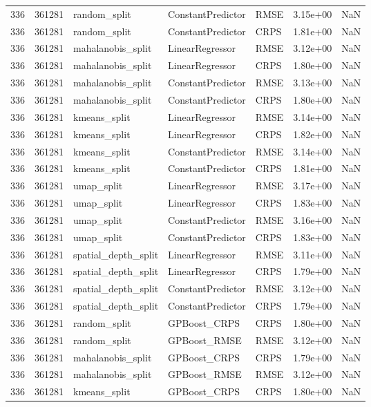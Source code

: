 \begin{tabular}{rrlllrr}
336 & 361281 & random\_split & ConstantPredictor & RMSE & 3.15e+00 & NaN \\
336 & 361281 & random\_split & ConstantPredictor & CRPS & 1.81e+00 & NaN \\
336 & 361281 & mahalanobis\_split & LinearRegressor & RMSE & 3.12e+00 & NaN \\
336 & 361281 & mahalanobis\_split & LinearRegressor & CRPS & 1.80e+00 & NaN \\
336 & 361281 & mahalanobis\_split & ConstantPredictor & RMSE & 3.13e+00 & NaN \\
336 & 361281 & mahalanobis\_split & ConstantPredictor & CRPS & 1.80e+00 & NaN \\
336 & 361281 & kmeans\_split & LinearRegressor & RMSE & 3.14e+00 & NaN \\
336 & 361281 & kmeans\_split & LinearRegressor & CRPS & 1.82e+00 & NaN \\
336 & 361281 & kmeans\_split & ConstantPredictor & RMSE & 3.14e+00 & NaN \\
336 & 361281 & kmeans\_split & ConstantPredictor & CRPS & 1.81e+00 & NaN \\
336 & 361281 & umap\_split & LinearRegressor & RMSE & 3.17e+00 & NaN \\
336 & 361281 & umap\_split & LinearRegressor & CRPS & 1.83e+00 & NaN \\
336 & 361281 & umap\_split & ConstantPredictor & RMSE & 3.16e+00 & NaN \\
336 & 361281 & umap\_split & ConstantPredictor & CRPS & 1.83e+00 & NaN \\
336 & 361281 & spatial\_depth\_split & LinearRegressor & RMSE & 3.11e+00 & NaN \\
336 & 361281 & spatial\_depth\_split & LinearRegressor & CRPS & 1.79e+00 & NaN \\
336 & 361281 & spatial\_depth\_split & ConstantPredictor & RMSE & 3.12e+00 & NaN \\
336 & 361281 & spatial\_depth\_split & ConstantPredictor & CRPS & 1.79e+00 & NaN \\
336 & 361281 & random\_split & GPBoost\_CRPS & CRPS & 1.80e+00 & NaN \\
336 & 361281 & random\_split & GPBoost\_RMSE & RMSE & 3.12e+00 & NaN \\
336 & 361281 & mahalanobis\_split & GPBoost\_CRPS & CRPS & 1.79e+00 & NaN \\
336 & 361281 & mahalanobis\_split & GPBoost\_RMSE & RMSE & 3.12e+00 & NaN \\
336 & 361281 & kmeans\_split & GPBoost\_CRPS & CRPS & 1.80e+00 & NaN \\

\end{tabular}
